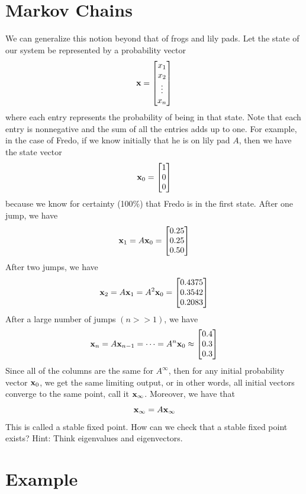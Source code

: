 \section*{Markov Chains}

We can generalize this notion beyond that of frogs and lily pads.  Let the state of our system be represented by a probability vector
\[
{\bf x} = \begin{bmatrix}
x_1\\
x_2\\
\vdots\\
x_n
\end{bmatrix}
\]
where each entry represents the probability of being in that state.  Note that each entry is nonnegative and the sum of all the entries adds up to one.  For example, in the case of Fredo, if we know initially that he is on lily pad $A$, then we have the state vector
\[
{\bf x}_0 = \begin{bmatrix}
1\\
0\\
0
\end{bmatrix}
\]
because we know for certainty (100\%) that Fredo is in the first state.  After one jump, we have
\[
{\bf x}_1 = A {\bf x}_0 = \begin{bmatrix}
0.25\\
0.25\\
0.50
\end{bmatrix}
\]
After two jumps, we have
\[
{\bf x}_2 = A {\bf x}_1 = A^2 {\bf x}_0 = \begin{bmatrix}
0.4375\\
0.3542\\
0.2083
\end{bmatrix}
\]
After a large number of jumps $(n>>1)$, we have
\[
{\bf x}_n = A {\bf x}_{n-1} = \dots = A^n {\bf x}_0 \approx \begin{bmatrix}
0.4\\
0.3\\
0.3
\end{bmatrix}
\]
Since all of the columns are the same for $A^\infty$, then for any initial probability vector ${\bf x}_0$, we get the same limiting output, or in other words, all initial vectors converge to the same point, call it ${\bf x}_\infty$.  Moreover, we have that
\[
{\bf x}_\infty = A {\bf x}_\infty
\]
This is called a stable fixed point.  How can we check that a stable fixed point exists?  Hint: Think eigenvalues and eigenvectors.

\section*{Example}


